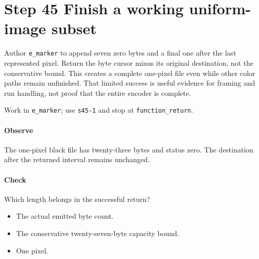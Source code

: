 \section{Step 45 Finish a working uniform-image subset}\label{qoi-s45}
Author \texttt{e\_marker} to append seven zero bytes and a final one after the last represented pixel. Return the byte cursor minus its original destination, not the conservative bound. This creates a complete one-pixel file even while other color paths remain unfinished. That limited success is useful evidence for framing and run handling, not proof that the entire encoder is complete.

Work in \texttt{e\_marker}; use \texttt{s45-1} and stop at \texttt{function\_return}.

\paragraph{Observe} The one-pixel black file has twenty-three bytes and status zero. The destination after the returned interval remains unchanged.

\paragraph{Check} Which length belongs in the successful return?
\begin{itemize}
  \item[A.] The actual emitted byte count.
  \item[B.] The conservative twenty-seven-byte capacity bound.
  \item[C.] One pixel.
\end{itemize}
